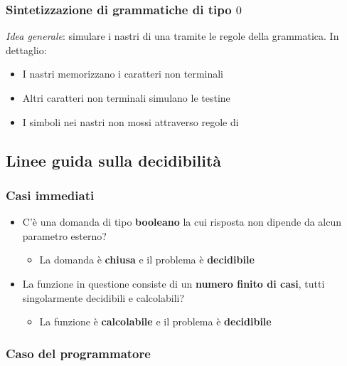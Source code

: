 \documentclass[italian, 10pt]{article}
\begin{document}
\subsubsection[Sintetizzazione di grammatiche di tipo 0]{Sintetizzazione di grammatiche di tipo \(0\)}

\begin{minipage}{0.99\textwidth}
  \bigskip
  \textit{Idea generale}: simulare i nastri di una \TM tramite le regole della grammatica.
  In dettaglio:
  \begin{itemize}
    \item I nastri memorizzano i caratteri non terminali
    \item Altri caratteri non terminali simulano le testine
    \item I simboli nei nastri non mossi attraverso regole di 
  \end{itemize}
  \bigskip
\end{minipage}

\subsection{Linee guida sulla decidibilità}

\subsubsection{Casi immediati}

\begin{itemize}
  \item C'è una domanda di tipo \textbf{booleano} la cui risposta non dipende da alcun parametro esterno?
        \begin{itemize}[label=\(\Rightarrow\)]
          \item La domanda è \textbf{chiusa} e il problema è \textbf{decidibile}
        \end{itemize}
  \item La funzione in questione consiste di un \textbf{numero finito di casi}, tutti singolarmente decidibili e calcolabili?
        \begin{itemize}[label=\(\Rightarrow\)]
          \item La funzione è \textbf{calcolabile} e il problema è \textbf{decidibile}
        \end{itemize}
\end{itemize}

\subsubsection{Caso del programmatore}
\end{document}
